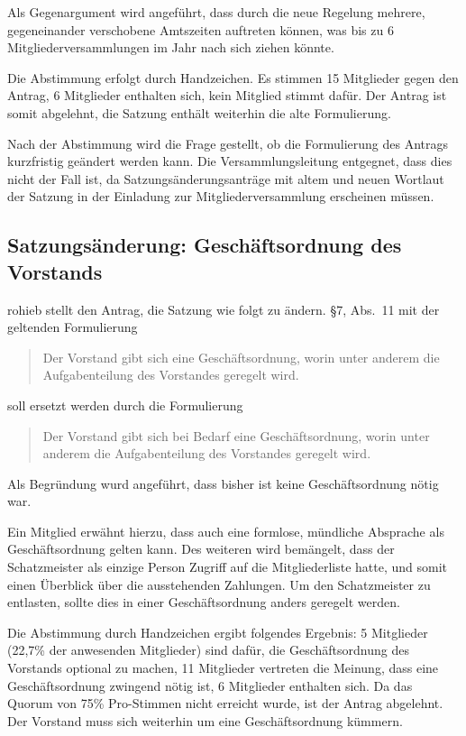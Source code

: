 \documentclass[a4paper,12pt]{scrartcl}
\begin{document}
Als Gegenargument wird angeführt, dass durch die neue Regelung mehrere,
gegeneinander verschobene Amtszeiten auftreten können, was bis zu 6
Mitgliederversammlungen im Jahr nach sich ziehen könnte.

Die Abstimmung erfolgt durch Handzeichen. Es stimmen 15 Mitglieder gegen den
Antrag, 6 Mitglieder enthalten sich, kein Mitglied stimmt dafür. Der Antrag ist
somit abgelehnt, die Satzung enthält weiterhin die alte Formulierung.

Nach der Abstimmung wird die Frage gestellt, ob die Formulierung des Antrags
kurzfristig geändert werden kann. Die Versammlungsleitung entgegnet, dass dies
nicht der Fall ist, da Satzungsänderungsanträge mit altem und neuen Wortlaut der
Satzung in der Einladung zur Mitgliederversammlung erscheinen müssen.

\subsection{Satzungsänderung: Geschäftsordnung des Vorstands}
rohieb stellt den Antrag, die Satzung wie folgt zu ändern. §7, Abs.~11 mit der
geltenden Formulierung
\begin{quote}
  Der Vorstand gibt sich eine Geschäftsordnung, worin unter anderem die
  Aufgabenteilung des Vorstandes geregelt wird.
\end{quote}
soll ersetzt werden durch die Formulierung
\begin{quote}
  Der Vorstand gibt sich bei Bedarf eine Geschäftsordnung, worin unter anderem
  die Aufgabenteilung des Vorstandes geregelt wird.
\end{quote}

Als Begründung wurd angeführt, dass bisher ist keine Geschäftsordnung nötig war.

Ein Mitglied erwähnt hierzu, dass auch eine formlose, mündliche Absprache als
Geschäftsordnung gelten kann. Des weiteren wird bemängelt, dass der
Schatzmeister als einzige Person Zugriff auf die Mitgliederliste hatte, und
somit einen Überblick über die ausstehenden Zahlungen. Um den Schatzmeister zu
entlasten, sollte dies in einer Geschäftsordnung anders geregelt werden.

Die Abstimmung durch Handzeichen ergibt folgendes Ergebnis: 5 Mitglieder
(22{,}7\% der anwesenden Mitglieder) sind dafür, die Geschäftsordnung des
Vorstands optional zu machen, 11 Mitglieder vertreten die Meinung, dass eine
Geschäftsordnung zwingend nötig ist, 6 Mitglieder enthalten sich. Da das Quorum
von 75\% Pro-Stimmen nicht erreicht wurde, ist der Antrag abgelehnt. Der
Vorstand muss sich weiterhin um eine Geschäftsordnung kümmern.
\end{document}
